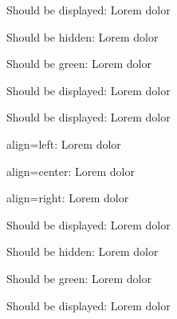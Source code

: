 


{}


Should be displayed: Lorem dolor

Should be hidden: Lorem  dolor

Should be green: Lorem  dolor

Should be displayed: Lorem  dolor

Should be displayed: Lorem  dolor


align=left: Lorem  dolor

align=center: Lorem  dolor

align=right: Lorem  dolor

Should be displayed: Lorem dolor

Should be hidden: Lorem  dolor

Should be green: Lorem  dolor

Should be displayed: Lorem  dolor

\bye
